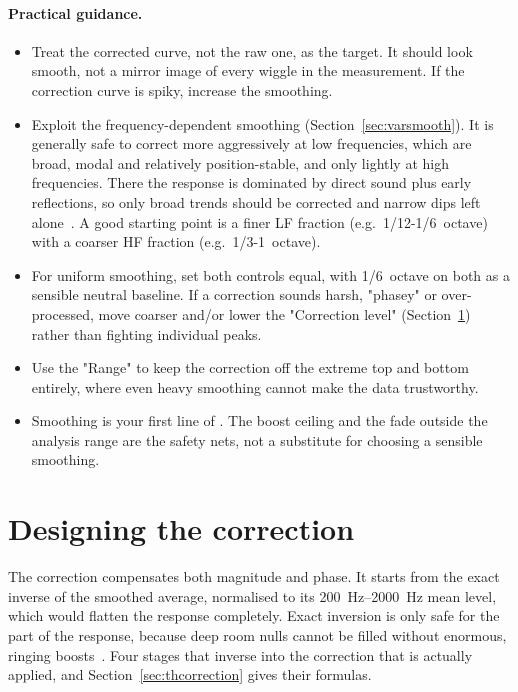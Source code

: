 \paragraph{Practical guidance.}
\begin{itemize}[nosep]
  \item Treat the corrected curve, not the raw one, as the target. It should look smooth, not a mirror image of every wiggle in the measurement. If the correction curve is spiky, increase the smoothing.
  \item Exploit the frequency-dependent smoothing (Section~\ref{sec:varsmooth}). It is generally safe to correct more aggressively at low frequencies, which are broad, modal and relatively position-stable, and only lightly at high frequencies. There the response is dominated by direct sound plus early reflections, so only broad trends should be corrected and narrow dips left alone~\cite{Toole}. A good starting point is a finer LF fraction (e.g.\ 1/12-1/6~octave) with a coarser HF fraction (e.g.\ 1/3-1~octave).
  \item For uniform smoothing, set both controls equal, with 1/6~octave on both as a sensible neutral baseline. If a correction sounds harsh, "phasey" or over-processed, move coarser and/or lower the "Correction level" (Section~\ref{sec:correction}) rather than fighting individual peaks.
  \item Use the "Range" to keep the correction off the extreme top and bottom entirely, where even heavy smoothing cannot make the data trustworthy.
  \item Smoothing is your first line of . The boost ceiling and the fade outside the analysis range are the safety nets, not a substitute for choosing a sensible smoothing.
\end{itemize}

\section{Designing the correction}\label{sec:correction}
The correction compensates both magnitude and phase. It starts from the exact inverse of the smoothed average, normalised to its \SIrange{200}{2000}{\hertz} mean level, which would flatten the response completely. Exact inversion is only safe for the  part of the response, because deep room nulls cannot be filled without enormous, ringing boosts~\cite{NeelyAllen,Mourjopoulos1994}. Four stages  that inverse into the correction that is actually applied, and Section~\ref{sec:thcorrection} gives their formulas.

